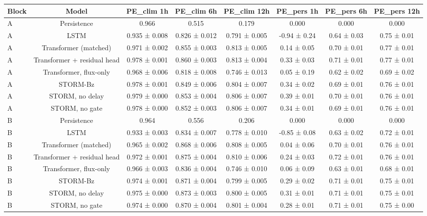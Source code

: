\begin{tabular}{lccccccc}
\toprule
Block & Model & PE\_clim 1h & PE\_clim 6h & PE\_clim 12h & PE\_pers 1h & PE\_pers 6h & PE\_pers 12h \\
\midrule
A & Persistence & 0.966 & 0.515 & 0.179 & 0.000 & 0.000 & 0.000 \\
A & LSTM & 0.935 ± 0.008 & 0.826 ± 0.012 & 0.791 ± 0.005 & -0.94 ± 0.24 & 0.64 ± 0.03 & 0.75 ± 0.01 \\
A & Transformer (matched) & 0.971 ± 0.002 & 0.855 ± 0.003 & 0.813 ± 0.005 & 0.14 ± 0.05 & 0.70 ± 0.01 & 0.77 ± 0.01 \\
A & Transformer + residual head & 0.978 ± 0.001 & 0.860 ± 0.003 & 0.813 ± 0.004 & 0.33 ± 0.03 & 0.71 ± 0.01 & 0.77 ± 0.01 \\
A & Transformer, flux-only & 0.968 ± 0.006 & 0.818 ± 0.008 & 0.746 ± 0.013 & 0.05 ± 0.19 & 0.62 ± 0.02 & 0.69 ± 0.02 \\
A & STORM-Bz & 0.978 ± 0.001 & 0.849 ± 0.006 & 0.804 ± 0.007 & 0.34 ± 0.02 & 0.69 ± 0.01 & 0.76 ± 0.01 \\
A & STORM, no delay & 0.979 ± 0.000 & 0.853 ± 0.004 & 0.806 ± 0.007 & 0.39 ± 0.01 & 0.70 ± 0.01 & 0.76 ± 0.01 \\
A & STORM, no gate & 0.978 ± 0.000 & 0.852 ± 0.003 & 0.806 ± 0.007 & 0.34 ± 0.01 & 0.69 ± 0.01 & 0.76 ± 0.01 \\
B & Persistence & 0.964 & 0.556 & 0.206 & 0.000 & 0.000 & 0.000 \\
B & LSTM & 0.933 ± 0.003 & 0.834 ± 0.007 & 0.778 ± 0.010 & -0.85 ± 0.08 & 0.63 ± 0.02 & 0.72 ± 0.01 \\
B & Transformer (matched) & 0.965 ± 0.002 & 0.868 ± 0.006 & 0.808 ± 0.005 & 0.04 ± 0.06 & 0.70 ± 0.01 & 0.76 ± 0.01 \\
B & Transformer + residual head & 0.972 ± 0.001 & 0.875 ± 0.004 & 0.810 ± 0.006 & 0.24 ± 0.03 & 0.72 ± 0.01 & 0.76 ± 0.01 \\
B & Transformer, flux-only & 0.966 ± 0.003 & 0.836 ± 0.004 & 0.746 ± 0.010 & 0.06 ± 0.09 & 0.63 ± 0.01 & 0.68 ± 0.01 \\
B & STORM-Bz & 0.974 ± 0.001 & 0.871 ± 0.004 & 0.799 ± 0.005 & 0.29 ± 0.02 & 0.71 ± 0.01 & 0.75 ± 0.01 \\
B & STORM, no delay & 0.975 ± 0.000 & 0.873 ± 0.003 & 0.800 ± 0.005 & 0.31 ± 0.01 & 0.71 ± 0.01 & 0.75 ± 0.01 \\
B & STORM, no gate & 0.974 ± 0.000 & 0.870 ± 0.004 & 0.801 ± 0.004 & 0.28 ± 0.01 & 0.71 ± 0.01 & 0.75 ± 0.00 \\

\end{tabular}
